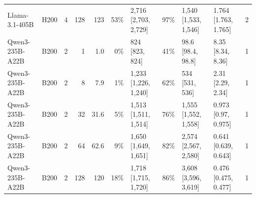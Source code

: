 \begin{landscape}
\begin{longtable}{llrrrrlrllr}
Llama-3.1-405B & H200 & 4 & 128 & 123 & 53\% & 2,716 {[}2,703, 2,729{]} & 97\% & 1,540 {[}1,533, 1,546{]} & 1.764 {[}1.763, 1.765{]} & 2 \\
Qwen3-235B-A22B & B200 & 2 & 1 & 1.0 & 0\% & 824 {[}823, 824{]} & 41\% & 98.6 {[}98.4, 98.8{]} & 8.35 {[}8.34, 8.36{]} & 1 \\
Qwen3-235B-A22B & B200 & 2 & 8 & 7.9 & 1\% & 1,233 {[}1,226, 1,240{]} & 62\% & 534 {[}531, 536{]} & 2.31 {[}2.29, 2.34{]} & 1 \\
Qwen3-235B-A22B & B200 & 2 & 32 & 31.6 & 5\% & 1,513 {[}1,511, 1,514{]} & 76\% & 1,555 {[}1,552, 1,558{]} & 0.973 {[}0.97, 0.975{]} & 1 \\
Qwen3-235B-A22B & B200 & 2 & 64 & 62.6 & 9\% & 1,650 {[}1,649, 1,651{]} & 82\% & 2,574 {[}2,567, 2,580{]} & 0.641 {[}0.639, 0.643{]} & 1 \\
Qwen3-235B-A22B & B200 & 2 & 128 & 120 & 18\% & 1,718 {[}1,715, 1,720{]} & 86\% & 3,608 {[}3,596, 3,619{]} & 0.476 {[}0.475, 0.477{]} & 1 \\
\end{longtable}
\endgroup
\end{landscape}
\restoregeometry
